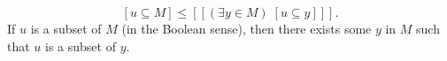 $$[u \subseteq M] \leq [[(\exists y \in M) \; [u \subseteq y]]].$$
If $u$ is a subset of $M$ (in the Boolean sense), then there exists some $y$ in $M$ such that $u$ is a subset of $y$.
